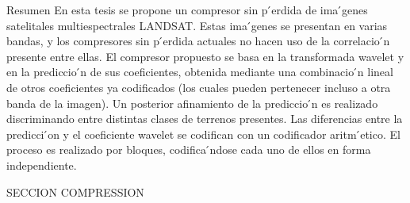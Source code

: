 Resumen
En esta tesis se propone un compresor sin p ́erdida de ima ́genes satelitales multiespectrales LANDSAT. Estas ima ́genes se presentan en varias bandas, y los compresores sin p ́erdida actuales no hacen uso de la correlacio ́n presente entre ellas. El compresor propuesto se basa en la transformada wavelet y en la prediccio ́n de sus coeficientes, obtenida mediante una combinacio ́n lineal de otros coeficientes ya codificados (los cuales pueden pertenecer incluso a otra banda de la imagen). Un posterior afinamiento de la prediccio ́n es realizado discriminando entre distintas clases de terrenos presentes. Las diferencias entre la predicci ́on y el coeficiente wavelet se codifican con un codificador aritm ́etico. El proceso es realizado por bloques, codifica ́ndose cada uno de ellos en forma independiente.





SECCION COMPRESSION






 













